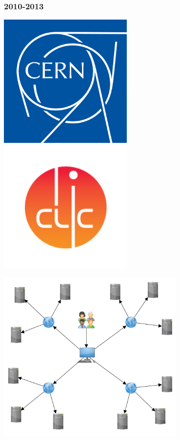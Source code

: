 \documentclass[14pt]{beamer}
\begin{document}
\begin{frame}
\frametitle{2010-2013}
\centering
\includegraphics[width=0.5\textwidth]{CERN}
\includegraphics[width=0.5\textwidth]{CLIC}

\end{frame}

\begin{frame}
\centering
\includegraphics[width=0.7\textwidth]{network}

\end{frame}
\end{document}
